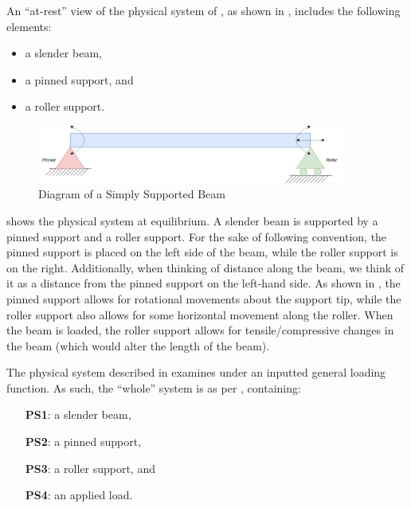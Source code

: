 \documentclass[12pt]{article}
\begin{document}
An ``at-rest'' view of the physical system of \progname{}, as shown in
, includes the following elements:

\begin{itemize}

    \item a slender beam,

    \item a pinned support, and

    \item a roller support.

\end{itemize}

\begin{figure}[H]
    \begin{center}
        \includegraphics[width=0.9\textwidth]{temp/beam_bending_diagram.drawio.png}
        \caption{\label{beam_bending_diagram} Diagram of a Simply Supported Beam}
    \end{center}
\end{figure}

 shows the physical system at equilibrium. A slender
beam is supported by a pinned support and a roller support. For the sake of
following convention, the pinned support is placed on the left side of the beam,
while the roller support is on the right. Additionally, when thinking of
distance along the beam, we think of it as a distance from the pinned support on
the left-hand side. As shown in , the pinned support
allows for rotational movements about the support tip, while the roller support
also allows for some horizontal movement along the roller. When the beam is
loaded, the roller support allows for tensile/compressive changes in the beam
(which would alter the length of the beam).

The physical system described in \progname{} examines
 under an inputted general loading function. As such,
the ``whole'' system is as per ,
containing:

\begin{itemize}

    \item[\textbf{PS1}:] a slender beam,

    \item[\textbf{PS2}:] a pinned support,

    \item[\textbf{PS3}:] a roller support, and

    \item[\textbf{PS4}:] an applied load.

\end{itemize}
\end{document}
